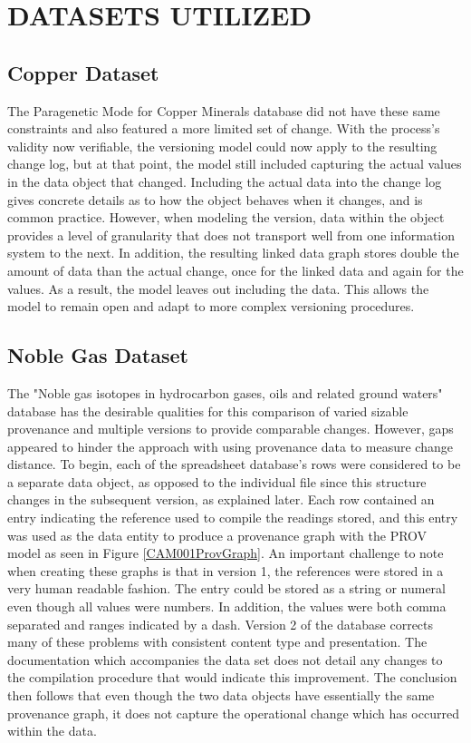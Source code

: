 
\chapter{DATASETS UTILIZED}

\section{Copper Dataset}

The Paragenetic Mode for Copper Minerals database did not have these same constraints and also featured a more limited set of change.
With the process's validity now verifiable, the versioning model could now apply to the resulting change log, but at that point, the model still included capturing the actual values in the data object that changed.
Including the actual data into the change log gives concrete details as to how the object behaves when it changes, and is common practice.
However, when modeling the version, data within the object provides a level of granularity that does not transport well from one information system to the next.
In addition, the resulting linked data graph stores double the amount of data than the actual change, once for the linked data and again for the values.
As a result, the model leaves out including the data.
This allows the model to remain open and adapt to more complex versioning procedures.

\section{Noble Gas Dataset}

The "Noble gas isotopes in hydrocarbon gases, oils and related ground waters" database has the desirable qualities for this comparison of varied sizable provenance and multiple versions to provide comparable changes.
However, gaps appeared to hinder the approach with using provenance data to measure change distance.
To begin, each of the spreadsheet database's rows were considered to be a separate data object, as opposed to the individual file since this structure changes in the subsequent version, as explained later.
Each row contained an entry indicating the reference used to compile the readings stored, and this entry was used as the data entity to produce a provenance graph with the PROV model as seen in Figure \ref{CAM001ProvGraph}.
An important challenge to note when creating these graphs is that in version 1, the references were stored in a very human readable fashion.
The entry could be stored as a string or numeral even though all values were numbers.
In addition, the values were both comma separated and ranges indicated by a dash.
Version 2 of the database corrects many of these problems with consistent content type and presentation.
The documentation which accompanies the data set does not detail any changes to the compilation procedure that would indicate this improvement.
The conclusion then follows that even though the two data objects have essentially the same provenance graph, it does not capture the operational change which has occurred within the data.

